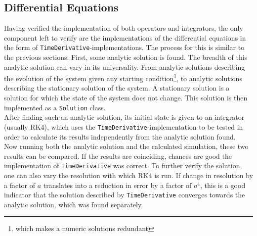 \subsection{Differential Equations}
Having verified the implementation of both operators and integrators, the only component left to verify are the implementations of the differential equations in the form of \texttt{TimeDerivative}-implementations.
The process for this is similar to the previous sections: First, some analytic solution is found.
The breadth of this analytic solution can vary in its universality.
From analytic solutions describing the evolution of the system given any starting condition\footnote{which makes a numeric solutions redundant}, to analytic solutions describing the stationary solution of the system.
A stationary solution is a solution for which the state of the system does not change.
This solution is then implemented as a \texttt{Solution} class.
\\
After finding such an analytic solution, its initial state is given to an integrator (usually RK4), which uses the \texttt{TimeDerivative}-implementation to be tested in order to calculate its results independently from the analytic solution found.
\\
Now running both the analytic solution and the calculated simulation, these two results can be compared.
If the results are coinciding, chances are good the implementation of \texttt{TimeDerivative} was correct.
To further verify the solution, one can also vary the resolution with which RK4 is run.
If change in resolution by a factor of $a$ translates into a reduction in error by a factor of $a^4$, this is a good indicator that the solution described by \texttt{TimeDerivative} converges towards the analytic solution, which was found separately.


